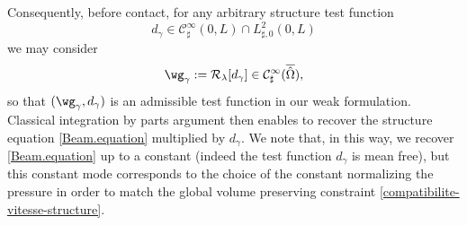 Consequently, before contact, for any arbitrary structure test function
\[
d_{\gamma} \in \mathcal{C}^{\infty}_{\sharp}(0,L) \cap L^2_{\sharp,0}(0,L)
\]
we may consider
\[
\wg_{\gamma} := \mathcal R_{{\lambda}}[d_{\gamma}] \in \mathcal{C}^{\infty}_{\sharp}(\overline{\hat{\Omega}}),
\]
so that $(\wg_{\gamma},d_{\gamma})$ is an admissible test function in our weak formulation. Classical integration by parts argument then enables to recover the structure equation \eqref{Beam.equation} multiplied by $d_{\gamma}$. We note that, in this way, we recover \eqref{Beam.equation} up to a constant (indeed the test function $d_{\gamma}$ is mean free), but this constant mode corresponds to the choice of the constant normalizing the pressure in order to match the global volume preserving constraint
\eqref{compatibilite-vitesse-structure}.

